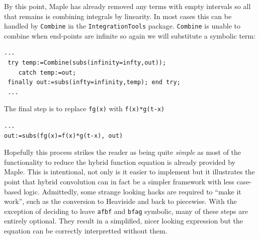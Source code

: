 By this point, Maple has already removed any terms with empty intervals so all that remains is combining integrals by 
linearity.
In most cases this can be handled by \texttt{Combine} in the \texttt{IntegrationTools} package.
\texttt{Combine} is unable to combine when end-points are infinite so again we will substitute a symbolic term:


\begin{lstlisting}[frame=single]
 ...
 try temp:=Combine(subs(infinity=infty,out));
    catch temp:=out;
 finally out:=subs(infty=infinity,temp); end try;
 ...
\end{lstlisting}


The final step is to replace \texttt{fg(x)} with \texttt{f(x)*g(t-x)}

\begin{lstlisting}[frame=single]
 ...
out:=subs(fg(x)=f(x)*g(t-x), out)
\end{lstlisting}


Hopefully this process strikes the reader as being quite \emph{simple} as most of the functionality to reduce 
the hybrid function equation is already provided by Maple. 
This is intentional, not only is it easier to implement but it illustrates the point that hybrid convolution can in fact be  a
simpler framework with less case-based logic.
Admittedly, some strange looking hacks are required to ``make it work'', such as the conversion to Heaviside and back 
to piecewise.
With the exception of deciding to leave \texttt{afbf} and \texttt{bfag} symbolic, many of these steps are entirely optional.
They result in a simplified, nicer looking expression but the equation can be correctly interpretted without them.


\newpage